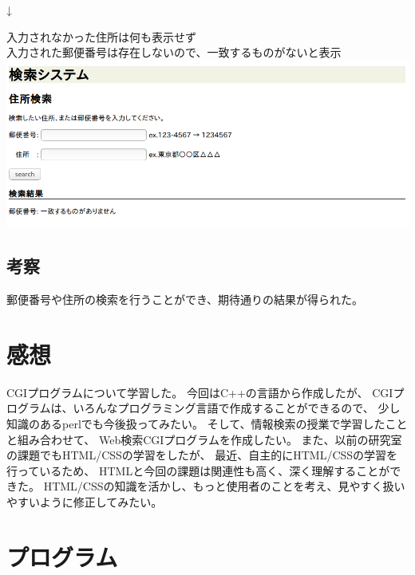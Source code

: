 \documentclass[a4j]{jarticle}
\begin{document}
\begin{center}
{\LARGE↓}

入力されなかった住所は何も表示せず\\
入力された郵便番号は存在しないので、一致するものがないと表示
\includegraphics[width=15cm]{result/result5.png}
\end{center}

\subsection{考察}
郵便番号や住所の検索を行うことができ、期待通りの結果が得られた。

\section{感想}
CGIプログラムについて学習した。
今回はC++の言語から作成したが、
CGIプログラムは、いろんなプログラミング言語で作成することができるので、
少し知識のあるperlでも今後扱ってみたい。
そして、情報検索の授業で学習したことと組み合わせて、
Web検索CGIプログラムを作成したい。
また、以前の研究室の課題でもHTML/CSSの学習をしたが、
最近、自主的にHTML/CSSの学習を行っているため、
HTMLと今回の課題は関連性も高く、深く理解することができた。
HTML/CSSの知識を活かし、もっと使用者のことを考え、見やすく扱いやすいように修正してみたい。


\section{プログラム}

\end{document}
